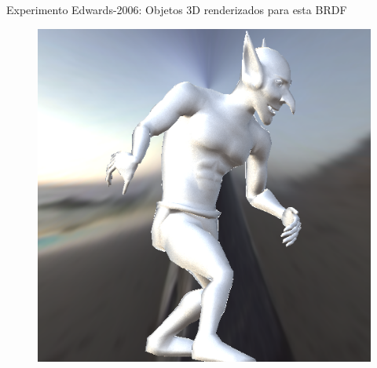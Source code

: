 \begin{frame}{Experimento Edwards-2006: Objetos 3D renderizados para esta BRDF}
\begin{figure}[H]
\endminipage\hfill
{}%
  \includegraphics[width=\linewidth]{./Imagens/brdfs/edwards-2006-goblin.png}
\endminipage
\end{figure}
\end{frame}

